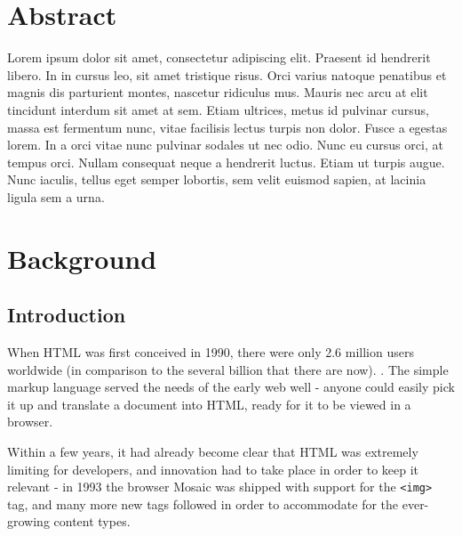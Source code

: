 \documentclass[ %
                    author={Aleena Baig},
                supervisor={Dr Simon Lock},
                    degree={BSc},
                     title={On Making Web Accessible Graphs},
                  subtitle={},
                      year={2019} ]{dissertation}
\begin{document}
\frontmatter


\makedecl

\tableofcontents


\setlength{\parskip}{1em}

\chapter{Abstract}


Lorem ipsum dolor sit amet, consectetur adipiscing elit. Praesent id hendrerit libero. In in cursus leo, sit amet tristique risus. Orci varius natoque penatibus et magnis dis parturient montes, nascetur ridiculus mus. Mauris nec arcu at elit tincidunt interdum sit amet at sem. Etiam ultrices, metus id pulvinar cursus, massa est fermentum nunc, vitae facilisis lectus turpis non dolor. Fusce a egestas lorem. In a orci vitae nunc pulvinar sodales ut nec odio. Nunc eu cursus orci, at tempus orci. Nullam consequat neque a hendrerit luctus. Etiam ut turpis augue. Nunc iaculis, tellus eget semper lobortis, sem velit euismod sapien, at lacinia ligula sem a urna.

\mainmatter

\chapter{Background}

\section{Introduction}
When HTML was first conceived in 1990, there were only 2.6 million users worldwide (in comparison to the several billion that there are now). \cite{ourworldindata:internet}. The simple markup language served the needs of the early web well - anyone could easily pick it up and translate a document into HTML, ready for it to be viewed in a browser.

Within a few years, it had already become clear that HTML was extremely limiting for developers, and innovation had to take place in order to keep it relevant - in 1993 the browser Mosaic was shipped with support for the \texttt{<img>} tag, and many more new tags followed in order to accommodate for the ever-growing content types. \cite{historyofhtml}
\end{document}
